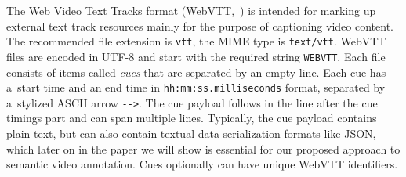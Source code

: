 \documentclass{sig-alternate}
\begin{document}
The Web Video Text Tracks format (WebVTT,~\cite{pfeiffer2013webvtt})
is intended for marking up external text track resources mainly
for the purpose of captioning video content.
The recommended file extension is \texttt{vtt},
the MIME type is \texttt{text/vtt}.
WebVTT files are encoded in UTF-8 and
start with the required string \texttt{WEBVTT}.
Each file consists of items called \emph{cues}
that are separated by an empty line.
Each cue has a~start time and an end time in
\texttt{hh:mm:ss.milliseconds} format,
separated by a~stylized ASCII arrow \texttt{-}\texttt{->}.
The cue payload follows in the line after the cue timings part
and can span multiple lines.
Typically, the cue payload contains plain text,
but can also contain textual data serialization formats like JSON,
which later on in the paper we will show is essential
for our proposed approach to semantic video annotation.
Cues optionally can have unique WebVTT identifiers.

\begin{comment}
\begin{table}[b!]\footnotesize
\begin{tabular}{ r p{5.5cm} } %
\textbf{WebVTT Kind} & \textbf{Description and Default Behavior}\\

\texttt{subtitles} & Transcription or translation of speech,
suitable for when sound is available but not understood.
Overlaid on the video.\\

\texttt{captions} & Transcription or translation of the dialogue,
sound effects, and other relevant audio information,
suitable for when sound is unavailable or not clearly audible.
Overlaid on the video;
labeled as appropriate for the hard-of-hearing.\\

\texttt{descriptions} & Textual descriptions of the video component
of the media resource, intended for audio synthesis
when the visual component is obscured, unavailable, or unusable.
Synthesized as audio.\\

\texttt{chapters} & Chapter titles, intended to be used for navigating
the media resource. Displayed as an interactive (potentially nested)
list in the user agent's interface.\\

\texttt{metadata} & Metadata intended for use from script context.
Not displayed by user agent.\\
\end{tabular}
  \caption{WebVTT text track kinds in HTML5~\cite{berjon2013html5}}
  \label{table:texttrackkinds}
\end{table}
\end{comment}
\end{document}
